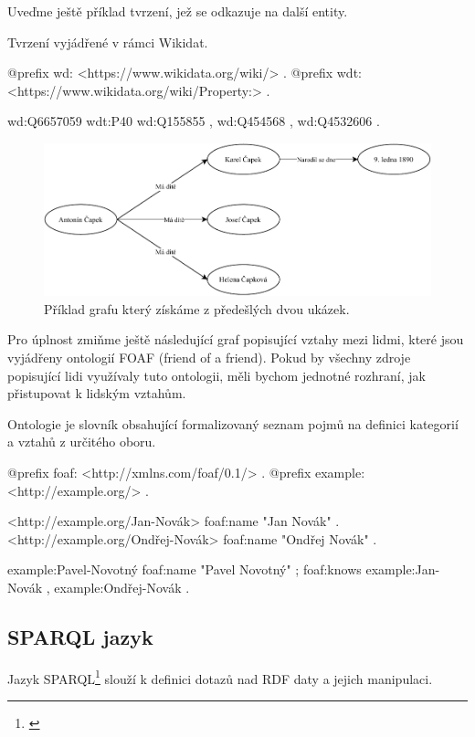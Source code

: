 Uveďme ještě příklad tvrzení, jež se odkazuje na další entity.
\begin{prikl}
Tvrzení  vyjádřené v rámci Wikidat.
\begin{code}
@prefix wd: <https://www.wikidata.org/wiki/> .
@prefix wdt: <https://www.wikidata.org/wiki/Property:> .

wd:Q6657059 wdt:P40 wd:Q155855 ,
                    wd:Q454568 ,
                    wd:Q4532606 .
\end{code}
\end{prikl}

\begin{figure}[h]
    \centering
    \includegraphics[width=\textwidth]{media/rdf.pdf}
    \caption{Příklad grafu který získáme z předešlých dvou ukázek.}
\end{figure}

Pro úplnost zmiňme ještě následující graf popisující vztahy mezi lidmi, které jsou vyjádřeny ontologií FOAF (friend of a friend). Pokud by všechny zdroje popisující lidi využívaly tuto ontologii, měli bychom jednotné rozhraní, jak přistupovat k lidským vztahům.

Ontologie je slovník obsahující formalizovaný seznam pojmů na definici kategorií a vztahů z určitého oboru.

\begin{code}
@prefix foaf: <http://xmlns.com/foaf/0.1/> .
@prefix example: <http://example.org/> .

<http://example.org/Jan-Novák> foaf:name "Jan Novák" .
<http://example.org/Ondřej-Novák> foaf:name "Ondřej Novák" .

example:Pavel-Novotný foaf:name "Pavel Novotný" ;
                      foaf:knows example:Jan-Novák ,
                                 example:Ondřej-Novák .
\end{code}

\subsection{SPARQL jazyk}
Jazyk SPARQL\footnote{\citet{Seaborne:13:SQL}} slouží k definici dotazů nad RDF daty a jejich manipulaci.

